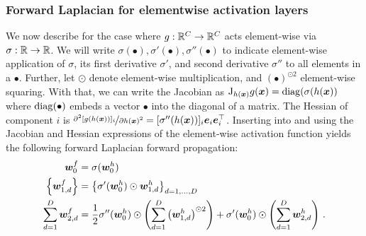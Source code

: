 \subsubsection{Forward Laplacian for elementwise activation layers}
We now describe  for the case where $g: {\mathbb{R}}^C \to {\mathbb{R}}^C$ acts element-wise via $\sigma: {\mathbb{R}} \to {\mathbb{R}}$.
We will write $\sigma(\bullet), \sigma'(\bullet), \sigma''(\bullet)$ to indicate element-wise application of $\sigma$, its first derivative $\sigma'$, and second derivative $\sigma''$ to all elements in a $\bullet$.
Further, let $\odot$ denote element-wise multiplication, and $(\bullet)^{\odot 2}$ element-wise squaring.
With that, we can write the Jacobian as $\mathrm{J}_{h({\bm{x}})}g({\bm{x}}) = \operatorname{diag}(\sigma(h({\bm{x}}))$ where $\operatorname{diag}(\bullet)$ embeds a vector $\bullet$ into the diagonal of a matrix.
The Hessian of component $i$ is $\nicefrac{\partial^2 [g(h({\bm{x}}))]_i}{\partial h({\bm{x}})^2} = [\sigma''(h({\bm{x}}))]_i {\bm{e}}_i {\bm{e}}_i^{\top}$.
Inserting  into  and using the Jacobian and Hessian expressions of the element-wise activation function yields the following forward Laplacian forward propagation:
\begin{subequations}
  \begin{align}
    {\bm{w}}_0^f
    &=
      \sigma({\bm{w}}_0^h)
    \\
    \left\{ {\bm{w}}_{1,d}^f \right\}
    &=
      \left\{ \sigma'({\bm{w}}_0^h) \odot {\bm{w}}_{1,d}^h \right\}_{d=1, \dots, D}
    \\
    \sum_{d=1}^D {\bm{w}}_{2,d}^f
    &=
      \frac{1}{2}
      \sigma''({\bm{w}}_0^h) \odot
      \left(
      \sum_{d=1}^D
      \left({\bm{w}}_{1,d}^h\right)^{\odot 2}
      \right)
      +
      \sigma'({\bm{w}}_0^h)
      \odot
      \left(
      \sum_{d=1}^D {\bm{w}}_{2,d}^h
      \right)\,.
  \end{align}
\end{subequations}

